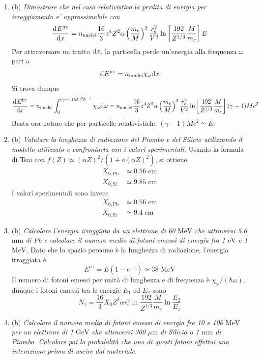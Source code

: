 \documentclass{article}
\renewcommand{\b}{(b)}
\renewcommand{\t}[1]{\textit{ #1}}
\begin{document}
\begin{enumerate}
	\item\b\t{Dimostrare che nel caso relativistico la perdita di energia per irraggiamento e'
		approssimabile con
		\[\dfrac{\mathrm{d} ^{}E^\mathrm{irr}}{\mathrm{d} {x}^{}}= n_\mathrm{nuclei}\frac{16}{3}z^4Z^2\alpha\left(\frac{m_e}{M}\right)^2\frac{r_e^2}{V^2}\ln \left[\frac{192}{Z^{1/3}}\frac{M}{m_e}\right]E\]}
	Per attraversare un tratto $\mathrm{d} x$, la particella perde un'energia alla frequenza $\omega$ pari a \[\mathrm{d} E^\textrm{irr}=n_\textrm{nuclei}\chi_\omega\mathrm{d} x\]
	Si trova dunque
	\[\dfrac{\mathrm{d} ^{}E^\textrm{irr}}{\mathrm{d} {x}^{}}=n_\textrm{nuclei}\int_{0}^{(\gamma-1)Mc^2\hbar^{-1}}\chi_\omega\mathrm{d} \omega= n_\mathrm{nuclei}\frac{16}{3}z^4Z^2\alpha\left(\frac{m_e}{M}\right)^2\frac{r_e^2}{V^2}\ln \left[\frac{192}{Z^{1/3}}\frac{M}{m_e}\right](\gamma-1)Mc^2\]
	Basta ora notare che per particelle relativistiche $(\gamma-1)Mc^2\simeq E$.
	\item\b\t{Valutare la lunghezza di radiazione del Piombo e del Silicio utilizzando il modello
		utilizzato e confrontarla con i valori sperimentali.}
	Usando la formula di Tsai con $f(Z)\simeq (\alpha Z)^2/(1+a(\alpha Z)^2)$, si ottiene
	\begin{align*}X_{0,\textrm{Pb}}&\simeq0.56\textrm{ cm}\\X_{0,\textrm{Si}}&\simeq9.85\textrm{ cm}\end{align*}
	I valori sperimentali sono invece
	\begin{align*}X_{0,\textrm{Pb}}&\simeq0.56\textrm{ cm}\\X_{0,\textrm{Si}}&\simeq9.4\textrm{ cm}\end{align*}
	\item\b\t{Calcolare l'energia irraggiata da un elettrone di 60 $\mathrm{MeV}$ che attraversi 5.6 $\mathrm{mm}$ di
		Pb e calcolare il numero medio di fotoni emessi di energia fra 1 $\mathrm{eV}$ e 1 $\mathrm{MeV}$.}
	Dato che lo spazio percorso è la lunghezza di radiazione, l'energia irraggiata è
	\[E^\textrm{irr}=E(1-e^{-1})\simeq38\textrm{ MeV}\]
	Il numero di fotoni emessi per unità di lunghezza e di frequenza è $\chi_\omega/(\hbar\omega)$, dunque i fotoni emessi tra le energie $E_1$ ed $E_2$ sono
	\[N_\gamma=\frac{16}{3}X_0Z^2\alpha r_e^2\ln\frac{192}{Z^{1/3}}\frac{M}{m_e}\ln\frac{E_2}{E_1}\]
	\item\b\t{Calcolare il numero medio di fotoni emessi di energia fra 10 e 100 $\mathrm{MeV}$ per un
		elettrone di 1 $\mathrm{GeV}$ che attraversi 300 $\mu\mathrm{m}$ di Silicio o 1 $\mathrm{mm}$ di Piombo. Calcolare
		poi la probabilità che uno di questi fotoni effettui una interazione prima di uscire
		dal materiale.}

\end{enumerate}
\end{document}
